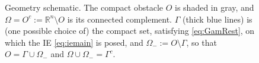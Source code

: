 \documentclass{birkjour}
\theoremstyle{definition}
\theoremstyle{remark}
\numberwithin{equation}{section}
\newcommand{\R}{\mathbb{R}}
\begin{document}

\begin{figure}
\begin{center}
\end{center}
\caption{Geometry schematic. The compact obstacle $O$ is shaded in gray, and $\Omega= O^c:= \R^n\setminus O$ is its connected complement. $\Gamma$ (thick blue lines) is (one possible choice of) the compact set, satisfying \eqref{eq:GamRest},  on which the IE \eqref{eq:iemain} is posed, and $\Omega_-:=O\setminus \Gamma$, so that $O=\Gamma\cup \Omega_-$ and $\Omega\cup \Omega_-=\Gamma^c$.}\label{fig:only}
\end{figure}

\end{document}
